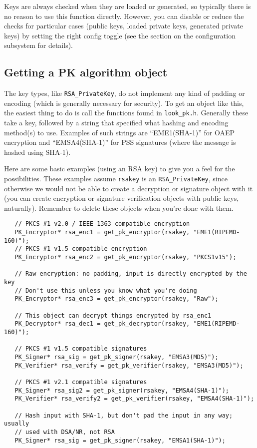 \documentclass{article}
\newcommand{\filename}[1]{\texttt{#1}}
\newcommand{\type}[1]{\texttt{#1}}
\begin{document}
Keys are always checked when they are loaded or generated, so typically there
is no reason to use this function directly. However, you can disable or reduce
the checks for particular cases (public keys, loaded private keys, generated
private keys) by setting the right config toggle (see the section on the
configuration subsystem for details).

\subsection{Getting a PK algorithm object}

The key types, like \type{RSA\_PrivateKey}, do not implement any kind of
padding or encoding (which is generally necessary for security). To get an
object like this, the easiest thing to do is call the functions found in
\filename{look\_pk.h}. Generally these take a key, followed by a string that
specified what hashing and encoding method(s) to use. Examples of such strings
are ``EME1(SHA-1)'' for OAEP encryption and ``EMSA4(SHA-1)'' for PSS signatures
(where the message is hashed using SHA-1).

Here are some basic examples (using an RSA key) to give you a feel for the
possibilities. These examples assume \type{rsakey} is an
\type{RSA\_PrivateKey}, since otherwise we would not be able to create a
decryption or signature object with it (you can create encryption or signature
verification objects with public keys, naturally). Remember to delete these
objects when you're done with them.

\begin{verbatim}
   // PKCS #1 v2.0 / IEEE 1363 compatible encryption
   PK_Encryptor* rsa_enc1 = get_pk_encryptor(rsakey, "EME1(RIPEMD-160)");
   // PKCS #1 v1.5 compatible encryption
   PK_Encryptor* rsa_enc2 = get_pk_encryptor(rsakey, "PKCS1v15");

   // Raw encryption: no padding, input is directly encrypted by the key
   // Don't use this unless you know what you're doing
   PK_Encryptor* rsa_enc3 = get_pk_encryptor(rsakey, "Raw");

   // This object can decrypt things encrypted by rsa_enc1
   PK_Decryptor* rsa_dec1 = get_pk_decryptor(rsakey, "EME1(RIPEMD-160)");

   // PKCS #1 v1.5 compatible signatures
   PK_Signer* rsa_sig = get_pk_signer(rsakey, "EMSA3(MD5)");
   PK_Verifier* rsa_verify = get_pk_verifier(rsakey, "EMSA3(MD5)");

   // PKCS #1 v2.1 compatible signatures
   PK_Signer* rsa_sig2 = get_pk_signer(rsakey, "EMSA4(SHA-1)");
   PK_Verifier* rsa_verify2 = get_pk_verifier(rsakey, "EMSA4(SHA-1)");

   // Hash input with SHA-1, but don't pad the input in any way; usually
   // used with DSA/NR, not RSA
   PK_Signer* rsa_sig = get_pk_signer(rsakey, "EMSA1(SHA-1)");
\end{verbatim}
\end{document}
